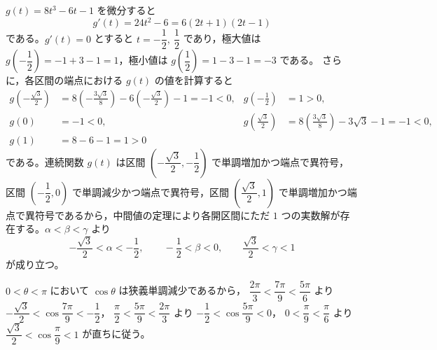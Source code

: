 $g(t)=8t^{3}-6t-1$ を微分すると
\[
  g'(t)=24t^{2}-6=6(2t+1)(2t-1)
\]
である。$g'(t)=0$ とすると $t=-\dfrac{1}{2},\ \dfrac{1}{2}$ であり，極大値は $g\!\left(-\dfrac{1}{2}\right)=-1+3-1=1$，極小値は $g\!\left(\dfrac{1}{2}\right)=1-3-1=-3$ である。
さらに，各区間の端点における $g(t)$ の値を計算すると
\begin{align*}
  g\!\left(-\frac{\sqrt{3}}{2}\right) &= 8\left(-\frac{3\sqrt{3}}{8}\right)-6\left(-\frac{\sqrt{3}}{2}\right)-1=-1<0, & g\!\left(-\frac{1}{2}\right) &= 1>0, \\
  g(0) &= -1<0, & g\!\left(\frac{\sqrt{3}}{2}\right) &= 8\left(\frac{3\sqrt{3}}{8}\right)-3\sqrt{3}-1=-1<0, \\
  g(1) &= 8-6-1=1>0 & &
\end{align*}
である。連続関数 $g(t)$ は区間 $\left(-\dfrac{\sqrt{3}}{2}, -\dfrac{1}{2}\right)$ で単調増加かつ端点で異符号，区間 $\left(-\dfrac{1}{2}, 0\right)$ で単調減少かつ端点で異符号，区間 $\left(\dfrac{\sqrt{3}}{2}, 1\right)$ で単調増加かつ端点で異符号であるから，中間値の定理により各開区間にただ $1$ つの実数解が存在する。$\alpha<\beta<\gamma$ より
\[
  -\frac{\sqrt{3}}{2}<\alpha<-\frac{1}{2},\qquad -\frac{1}{2}<\beta<0,\qquad \frac{\sqrt{3}}{2}<\gamma<1
\]
が成り立つ。

\begin{betsu}[別解：余弦関数の単調性による直接証明]
$0<\theta<\pi$ において $\cos\theta$ は狭義単調減少であるから，
$\dfrac{2\pi}{3}<\dfrac{7\pi}{9}<\dfrac{5\pi}{6}$ より $-\dfrac{\sqrt{3}}{2}<\cos\dfrac{7\pi}{9}<-\dfrac{1}{2}$，
$\dfrac{\pi}{2}<\dfrac{5\pi}{9}<\dfrac{2\pi}{3}$ より $-\dfrac{1}{2}<\cos\dfrac{5\pi}{9}<0$，
$0<\dfrac{\pi}{9}<\dfrac{\pi}{6}$ より $\dfrac{\sqrt{3}}{2}<\cos\dfrac{\pi}{9}<1$ が直ちに従う。
\end{betsu}

